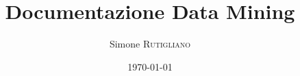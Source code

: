 \documentclass[a4paper,12pt,oneside,onecolumn]{article}
\title{Documentazione Data Mining} %
\author{Simone \textsc{Rutigliano} }
\date{\today}
\begin{document}

	\tableofcontents

	\begingroup
	\renewcommand\numberline[1]{}
	\listoffigures
	\endgroup

	\begingroup
	\renewcommand\numberline[1]{}
	\listoftables
	\endgroup

	\newpage

	
	\clearpage
	
	\clearpage
	
	\clearpage
    
	\clearpage
    
	\clearpage
    
	\clearpage
    
	\clearpage
    
	\clearpage
    
	
\end{document}
